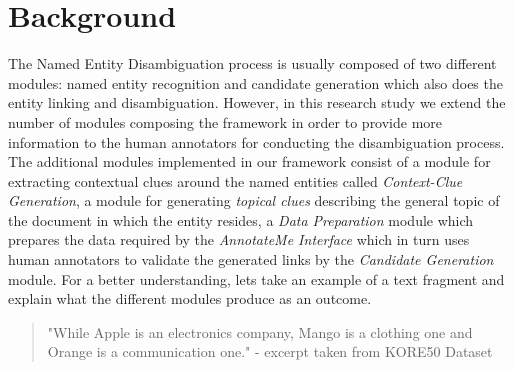 \section{Background}
\label{framework:background}
The Named Entity Disambiguation process is usually composed of two different modules: named entity recognition and candidate generation which also does the entity linking and disambiguation. However, in this research study we extend the number of modules composing the framework in order to provide more information to the human annotators for conducting the disambiguation process. The additional modules implemented in our framework consist of a module for extracting contextual clues around the named entities called \textit{Context-Clue Generation}, a module for generating \textit{topical clues} describing the general topic of the document in which the entity resides, a \textit{Data Preparation} module which prepares the data required by the \textit{AnnotateMe Interface} which in turn uses human annotators to validate the generated links by the \textit{Candidate Generation} module. For a better understanding, lets take an example of a text fragment and explain what the different modules produce as an outcome.

\begin{quote}
 "While Apple is an electronics company, Mango is a clothing one and Orange is a communication one." - excerpt taken from KORE50 Dataset
\end{quote}

